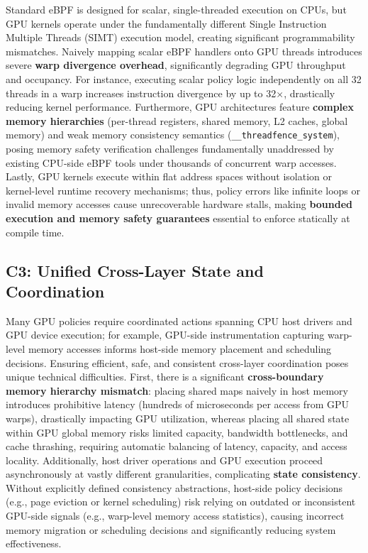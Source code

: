 Standard eBPF is designed for scalar, single-threaded execution on CPUs, but GPU kernels operate under the fundamentally different Single Instruction Multiple Threads (SIMT) execution model, creating significant programmability mismatches. Naively mapping scalar eBPF handlers onto GPU threads introduces severe \textbf{warp divergence overhead}, significantly degrading GPU throughput and occupancy. For instance, executing scalar policy logic independently on all 32 threads in a warp increases instruction divergence by up to 32$\times$, drastically reducing kernel performance. Furthermore, GPU architectures feature \textbf{complex memory hierarchies} (per-thread registers, shared memory, L2 caches, global memory) and weak memory consistency semantics (\texttt{\_\_threadfence\_system}), posing memory safety verification challenges fundamentally unaddressed by existing CPU-side eBPF tools under thousands of concurrent warp accesses. Lastly, GPU kernels execute within flat address spaces without isolation or kernel-level runtime recovery mechanisms; thus, policy errors like infinite loops or invalid memory accesses cause unrecoverable hardware stalls, making \textbf{bounded execution and memory safety guarantees} essential to enforce statically at compile time.

\subsection{C3: Unified Cross-Layer State and Coordination}

Many GPU policies require coordinated actions spanning CPU host drivers and GPU device execution; for example, GPU-side instrumentation capturing warp-level memory accesses informs host-side memory placement and scheduling decisions. Ensuring efficient, safe, and consistent cross-layer coordination poses unique technical difficulties. First, there is a significant \textbf{cross-boundary memory hierarchy mismatch}: placing shared maps naively in host memory introduces prohibitive latency (hundreds of microseconds per access from GPU warps), drastically impacting GPU utilization, whereas placing all shared state within GPU global memory risks limited capacity, bandwidth bottlenecks, and cache thrashing, requiring automatic balancing of latency, capacity, and access locality. Additionally, host driver operations and GPU execution proceed asynchronously at vastly different granularities, complicating \textbf{state consistency}. Without explicitly defined consistency abstractions, host-side policy decisions (e.g., page eviction or kernel scheduling) risk relying on outdated or inconsistent GPU-side signals (e.g., warp-level memory access statistics), causing incorrect memory migration or scheduling decisions and significantly reducing system effectiveness.

